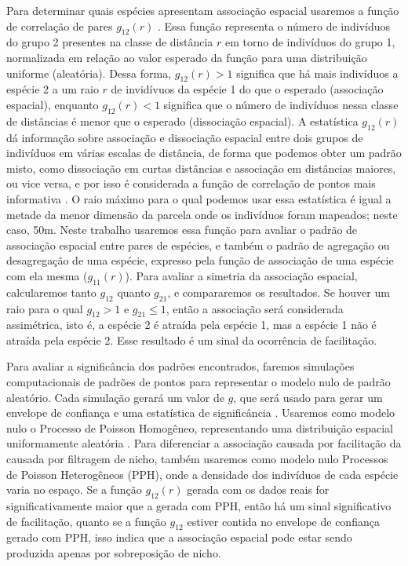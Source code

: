 \documentclass[twoside,12pt,a4paper]{report}
\begin{document}
Para determinar quais espécies apresentam associação espacial usaremos a função de correlação
de pares
$g_{12}(r)$ \citep{IllianBook,WiegandBook,Stoyan1994,spatstatBook}. Essa função representa o número de indivíduos do grupo 2 presentes na classe de distância $r$ em
torno de indivíduos do grupo 1, normalizada em relação ao valor esperado da função para uma
distribuição uniforme (aleatória). Dessa forma, $g_{12}(r) > 1$ significa que há mais indivíduos a
espécie 2 a um raio $r$ de invidívuos da espécie 1 do que o esperado (associação espacial),
enquanto $g_{12}(r) < 1 $ significa que o número de indivíduos nessa classe de distâncias é menor
que o esperado (dissociação espacial). A estatística $g_{12}(r)$ dá informação sobre associação e dissociação espacial
entre dois grupos de indivíduos em várias escalas de distância, de forma que podemos obter um padrão
misto, como dissociação em curtas distâncias e associação em distâncias maiores, ou vice
versa, e por isso é considerada a função de correlação de pontos mais informativa \citep{IllianBook}. O
raio máximo para o qual podemos usar essa estatística é igual a metade da menor dimensão da parcela
onde os indivíduos foram mapeados; neste caso, 50m. Neste trabalho usaremos essa
função para avaliar o padrão de associação espacial entre pares de espécies, e também o padrão de
agregação ou desagregação de uma espécie, expresso pela função de associação de uma espécie com ela
mesma ($g_{11}(r)$). Para avaliar a simetria da associação espacial, calcularemos tanto
$g_{12}$ quanto $g_{21}$, e compararemos os resultados. Se houver um raio para o qual $g_{12}
>1 $ e $g_{21} \leq 1$, então a associação será considerada assimétrica, isto é, a espécie 2
é atraída pela espécie 1, mas a espécie 1 não é atraída pela espécie 2. Esse resultado é um
sinal da ocorrência de facilitação.

Para avaliar a significância dos padrões encontrados, faremos simulações computacionais de padrões
de pontos para representar o modelo nulo de padrão aleatório. Cada simulação gerará um valor de
$g$, que será usado para gerar um envelope de confiança e uma estatística de significância
\citep{IllianBook,DiggleBook}. Usaremos como modelo nulo o Processo de Poisson Homogêneo,
representando uma distribuição espacial uniformamente aleatória
\citep{refs}. Para diferenciar a associação causada por facilitação da causada por filtragem
de nicho, também usaremos como modelo nulo Processos de Poisson Heterogêneos (PPH), onde a
densidade dos indivíduos de cada espécie varia no espaço. Se a função $g_{12}(r)$ gerada com
os dados reais for
significativamente maior que a gerada com PPH, então há um sinal significativo
de facilitação, quanto se a função $g_{12}$ estiver contida no envelope de confiança gerado
com PPH, isso indica que a associação espacial pode estar sendo produzida apenas por
sobreposição de nicho.
\end{document}
